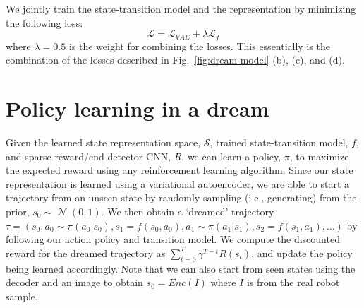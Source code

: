 \documentclass[letterpaper, 10 pt, conference]{ieeeconf}
\newcommand{\mryoo}[1]{\fxnote{\hl{Michael: #1}}}
\DeclareMathOperator{\N}{\mathcal{N}}
\begin{document}
We jointly train the state-transition model and the representation by minimizing the following loss:
\begin{equation}
\mathcal{L} = \mathcal{L}_{VAE} + \lambda \mathcal{L}_f    
\end{equation}
where $\lambda=0.5$ is the weight for combining the losses. This essentially is the combination of the losses described in Fig.~\ref{fig:dream-model} (b), (c), and (d). 






\section{Policy learning in a dream}



Given the learned state representation space, $\mathcal{S}$, trained state-transition model, $f$, and sparse reward/end detector CNN, $R$, we can learn a policy, $\pi$, to maximize the expected reward using any reinforcement learning algorithm.
Since our state representation is learned using a variational autoencoder, we are able to start a trajectory from an unseen state by randomly sampling (i.e., generating) from the prior, $s_0\sim\N(0,1)$.
We then obtain a `dreamed' trajectory $\tau = (s_0, a_0\sim\pi(a_0|s_0), s_1=f(s_0, a_0), a_1\sim\pi(a_1|s_1), s_2=f(s_1, a_1), \ldots)$ by following our action policy and transition model. 
We compute the discounted reward for the dreamed trajectory as $\sum_{t=0}^T \gamma^{T-t} R(s_t)$, and update the policy being learned accordingly. Note that we can also start from seen states using the decoder and an image to obtain $s_0=Enc(I)$ where $I$ is from the real robot sample.
\end{document}
